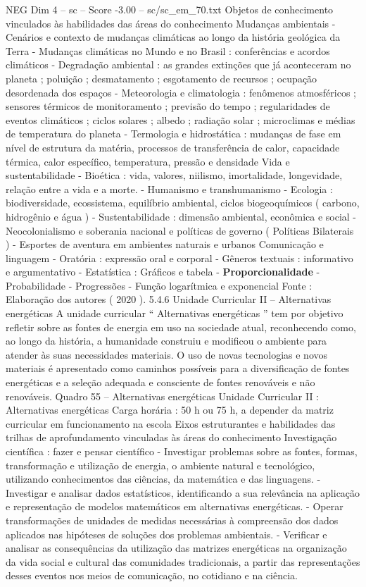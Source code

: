 \begin{textsample}{NEG Dim 4 – sc – Score -3.00 – sc/sc\_em\_70.txt}
Objetos de conhecimento vinculados às habilidades das áreas do conhecimento Mudanças ambientais - Cenários e contexto de mudanças climáticas ao longo da história geológica da Terra - Mudanças climáticas no Mundo e no Brasil : conferências e acordos climáticos - Degradação ambiental : as grandes extinções que já aconteceram no planeta ; poluição ; desmatamento ; esgotamento de recursos ; ocupação desordenada dos espaços - Meteorologia e climatologia : fenômenos atmosféricos ; sensores térmicos de monitoramento ; previsão do tempo ; regularidades de eventos climáticos ; ciclos solares ; albedo ; radiação solar ; microclimas e médias de temperatura do planeta - Termologia e hidrostática : mudanças de fase em nível de estrutura da matéria, processos de transferência de calor, capacidade térmica, calor específico, temperatura, pressão e densidade Vida e sustentabilidade - Bioética : vida, valores, niilismo, imortalidade, longevidade, relação entre a vida e a morte. - Humanismo e transhumanismo - Ecologia : biodiversidade, ecossistema, equilíbrio ambiental, ciclos biogeoquímicos ( carbono, hidrogênio e água ) - Sustentabilidade : dimensão ambiental, econômica e social - Neocolonialismo e soberania nacional e políticas de governo ( Políticas Bilaterais ) - Esportes de aventura em ambientes naturais e urbanos Comunicação e linguagem - Oratória : expressão oral e corporal - Gêneros textuais : informativo e argumentativo - Estatística : Gráficos e tabela - \textbf{Proporcionalidade} - Probabilidade - Progressões - Função logarítmica e exponencial Fonte : Elaboração dos autores ( 2020 ). 5.4.6 Unidade Curricular II – Alternativas energéticas A unidade curricular “ Alternativas energéticas ” tem por objetivo refletir sobre as fontes de energia em uso na sociedade atual, reconhecendo como, ao longo da história, a humanidade construiu e modificou o ambiente para atender às suas necessidades materiais.
O uso de novas tecnologias e novos materiais é apresentado como caminhos possíveis para a diversificação de fontes energéticas e a seleção adequada e consciente de fontes renováveis e não renováveis.
Quadro 55 – Alternativas energéticas Unidade Curricular II : Alternativas energéticas Carga horária : 50 h ou 75 h, a depender da matriz curricular em funcionamento na escola Eixos estruturantes e habilidades das trilhas de aprofundamento vinculadas às áreas do conhecimento Investigação científica : fazer e pensar científico - Investigar problemas sobre as fontes, formas, transformação e utilização de energia, o ambiente natural e tecnológico, utilizando conhecimentos das ciências, da matemática e das linguagens. - Investigar e analisar dados estatísticos, identificando a sua relevância na aplicação e representação de modelos matemáticos em alternativas energéticas. - Operar transformações de unidades de medidas necessárias à compreensão dos dados aplicados nas hipóteses de soluções dos problemas ambientais. - Verificar e analisar as consequências da utilização das matrizes energéticas na organização da vida social e cultural das comunidades tradicionais, a partir das representações desses eventos nos meios de comunicação, no cotidiano e na ciência.

\end{textsample}
